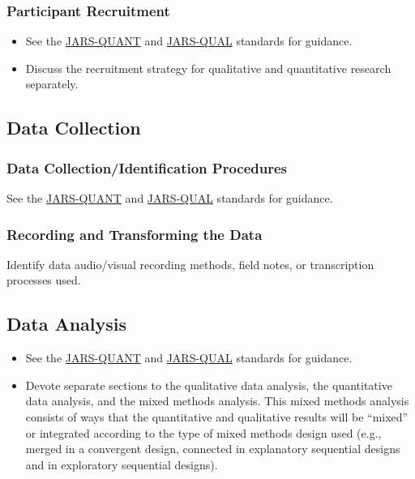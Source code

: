 \documentclass[acmsmall,screen,anonymous,review]{acmart}
\begin{document}
\subsubsection{Participant Recruitment}
\begin{itemize}
\item See the \href{https://apastyle.apa.org/jars/quantitative}{JARS-QUANT} and \href{https://apastyle.apa.org/jars/qualitative}{JARS-QUAL} standards for guidance.
\item Discuss the recruitment strategy for qualitative and quantitative research separately.
\end{itemize}

\subsection{Data Collection}

\subsubsection{Data Collection/Identification Procedures}

See the \href{https://apastyle.apa.org/jars/quantitative}{JARS-QUANT} and \href{https://apastyle.apa.org/jars/qualitative}{JARS-QUAL} standards for guidance.

\subsubsection{Recording and Transforming the Data}

Identify data audio/visual recording methods, field notes, or transcription processes used.

\subsection{Data Analysis}
\begin{itemize}
\item See the \href{https://apastyle.apa.org/jars/quantitative}{JARS-QUANT} and \href{https://apastyle.apa.org/jars/qualitative}{JARS-QUAL} standards for guidance.
\item Devote separate sections to the qualitative data analysis, the quantitative data analysis, and the mixed methods analysis. This mixed methods analysis consists of ways that the quantitative and qualitative results will be “mixed” or integrated according to the type of mixed methods design used (e.g., merged in a convergent design, connected in explanatory sequential designs and in exploratory sequential designs).
\end{itemize}
\end{document}
